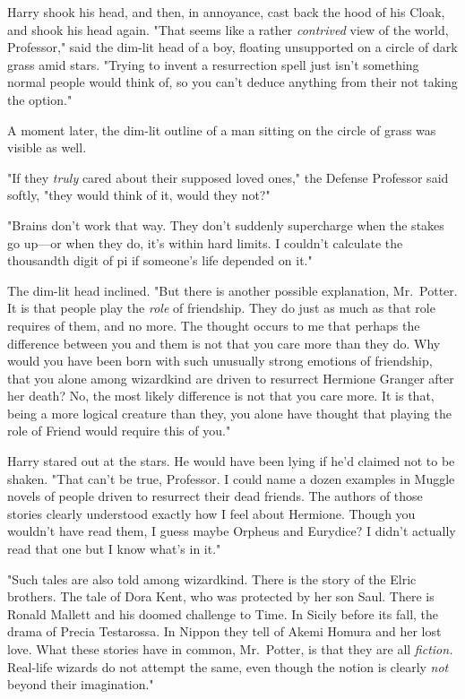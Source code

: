 Harry shook his head, and then, in annoyance, cast back the hood of his Cloak,
and shook his head again. "That seems like a rather \emph{contrived} view of
the world, Professor," said the dim-lit head of a boy, floating unsupported on
a circle of dark grass amid stars. "Trying to invent a resurrection spell just
isn't something normal people would think of, so you can't deduce anything from
their not taking the option."

A moment later, the dim-lit outline of a man sitting on the circle of grass was
visible as well.

"If they \emph{truly} cared about their supposed loved ones," the Defense
Professor said softly, "they would think of it, would they not?"

"Brains don't work that way. They don't suddenly supercharge when the stakes go
up—or when they do, it's within hard limits. I couldn't calculate the
thousandth digit of pi if someone's life depended on it."

The dim-lit head inclined. "But there is another possible explanation,
Mr.~Potter. It is that people play the \emph{role} of friendship. They do just
as much as that role requires of them, and no more. The thought occurs to me
that perhaps the difference between you and them is not that you care more than
they do. Why would you have been born with such unusually strong emotions of
friendship, that you alone among wizardkind are driven to resurrect Hermione
Granger after her death? No, the most likely difference is not that you care
more. It is that, being a more logical creature than they, you alone have
thought that playing the role of Friend would require this of you."

Harry stared out at the stars. He would have been lying if he'd claimed not to
be shaken. "That{\el} can't be true, Professor. I could name a dozen
examples in Muggle novels of people driven to resurrect their dead friends. The
authors of those stories clearly understood exactly how I feel about Hermione.
Though you wouldn't have read them, I guess{\el} maybe Orpheus and Eurydice?
I didn't actually read that one but I know what's in it."

"Such tales are also told among wizardkind. There is the story of the Elric
brothers. The tale of Dora Kent, who was protected by her son Saul. There is
Ronald Mallett and his doomed challenge to Time. In Sicily before its fall, the
drama of Precia Testarossa. In Nippon they tell of Akemi Homura and her lost
love. What these stories have in common, Mr.~Potter, is that they are all
\emph{fiction.} Real-life wizards do not attempt the same, even though the
notion is clearly \emph{not} beyond their imagination."

